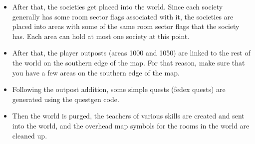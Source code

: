 \begin{itemize}
\item After that, the societies get placed into the world. Since each 
society generally has some room sector flags associated with it,
the societies are placed into areas with some of the same
room sector flags that the society has. Each area can hold at most
one society at this point.

\item After that, the player outposts (areas 1000 and 1050) are 
linked to the rest of the world on the southern edge of the map. 
For that reason, make sure that you have a few areas on the
southern edge of the map.

\item Following the outpost addition, some simple quests (fedex quests)
are generated using the questgen code.

\item Then the world is purged, the teachers of various skills are
  created and sent into the world, and the overhead map symbols for the
rooms in the world are cleaned up.

\end{itemize}
